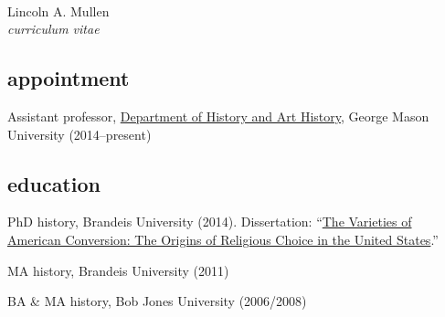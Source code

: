 \documentclass[11pt]{article}
\begin{document}
\thispagestyle{fancy}
\fancyfoot{}
\fancyhead{}
\renewcommand{\headrulewidth}{0pt}

\hfill\hfill\hfill
\hfill\hfill\hfill
\hfill\hfill\hfill
\hfill\hfill\hfill
\begin{minipage}[t]{1.4in}
   \\
\end{minipage}
\hfill
\begin{minipage}[t]{1.9in}
\end{minipage}

\vspace{0.5in}

{\Large Lincoln A. Mullen}\\
\emph{curriculum vitae}\\[0.5cm]

\vspace{0.05in}

\subsection{appointment}\label{appointment}

Assistant professor, \href{http://historyarthistory.gmu.edu/}{Department
  of History and Art History}, George Mason University (2014--present)

\subsection{education}\label{education}

PhD history, Brandeis University (2014). Dissertation:
``\href{/research/\#dissertation}{The Varieties of American Conversion:
  The Origins of Religious Choice in the United States}.''

MA history, Brandeis University (2011)

BA \& MA history, Bob Jones University (2006/2008)
\end{document}
